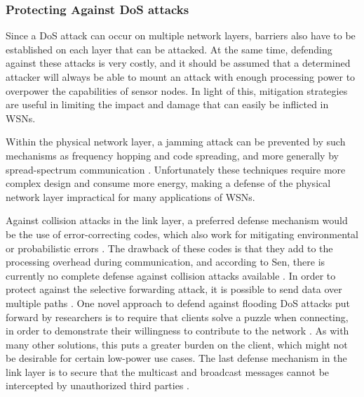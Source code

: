 \documentclass[12pt,a4paper,twoside]{report}
\begin{document}
\subsubsection{Protecting Against DoS attacks}
Since a DoS attack can occur on multiple network layers, barriers also have to be established on each layer that can be attacked. At the same time, defending against these attacks is very costly, and it should be assumed that a determined attacker will always be able to mount an attack with enough processing power to overpower the capabilities of sensor nodes. In light of this, mitigation strategies are useful in limiting the impact and damage that can easily be inflicted in WSNs.\par
Within the physical network layer, a jamming attack can be prevented by such mechanisms as frequency hopping and code spreading, and more generally by spread-spectrum communication \cite{sen:2009}. Unfortunately these techniques require more complex design and consume more energy, making a defense of the physical network layer impractical for many applications of WSNs.\par
Against collision attacks in the link layer, a preferred defense mechanism would be the use of error-correcting codes, which also work for mitigating environmental or probabilistic errors \cite{sen:2009}. The drawback of these codes is that they add to the processing overhead during communication, and according to Sen, there is currently no complete defense against collision attacks available \cite{sen:2009}.  In order to protect against the selective forwarding attack, it is possible to send data over multiple paths \cite{sen:2009}. One novel approach to defend against flooding DoS attacks put forward by researchers is to require that clients solve a puzzle when connecting, in order to demonstrate their willingness to contribute to the network \cite{sen:2009}. As with many other solutions, this puts a greater burden on the client, which might not be desirable for certain low-power use cases. The last defense mechanism in the link layer is to secure that the multicast and broadcast messages cannot be intercepted by unauthorized third parties \cite{sen:2009}. \par
\end{document}
